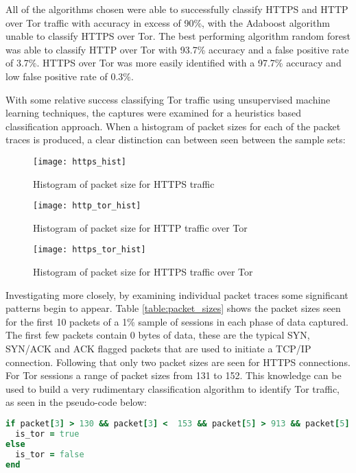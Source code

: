 \documentclass[conference]{IEEEtran}
\begin{document}
All of the algorithms chosen were able to successfully classify HTTPS and HTTP
over Tor traffic with accuracy in excess of 90\%, with the Adaboost algorithm
unable to classify HTTPS over Tor. The best performing algorithm random forest
was able to classify HTTP over Tor with 93.7\% accuracy and a false positive
rate of 3.7\%. HTTPS over Tor was more easily identified with a 97.7\% accuracy
and low false positive rate of 0.3\%.



With some relative success classifying Tor traffic using unsupervised machine
learning techniques, the captures were examined for a heuristics based
classification approach. When a histogram of packet sizes for each of the
packet traces is produced, a clear distinction can between seen between the
sample sets:

\begin{figure}[H]
  \centering\texttt{[image: https\_hist]}
  \caption{Histogram of packet size for HTTPS traffic}
  \label{https_hist}
\end{figure}

\begin{figure}[H]
  \centering\texttt{[image: http\_tor\_hist]}
  \caption{Histogram of packet size for HTTP traffic over Tor}
  \label{http_tor_hist}
\end{figure}

\begin{figure}[H]
  \centering\texttt{[image: https\_tor\_hist]}
  \caption{Histogram of packet size for HTTPS traffic over Tor}
  \label{https_tor_hist}
\end{figure}

Investigating more closely, by examining individual packet traces some
significant patterns begin to appear. Table \ref{table:packet_sizes} shows the
packet sizes seen for the first 10 packets of a 1\% sample of sessions in each
phase of data captured. The first few packets contain 0 bytes of data, these
are the typical SYN, SYN/ACK and ACK flagged packets that are used to initiate
a TCP/IP connection. Following that only two packet sizes are seen for HTTPS
connections. For Tor sessions a range of packet sizes from 131 to 152. This
knowledge can be used to build a very rudimentary classification algorithm to
identify Tor traffic, as seen in the pseudo-code below:

\begin{lstlisting}[language=ruby]
if packet[3] > 130 && packet[3] <  153 && packet[5] > 913 && packet[5] < 937
  is_tor = true
else
  is_tor = false
end
\end{lstlisting}
\end{document}
